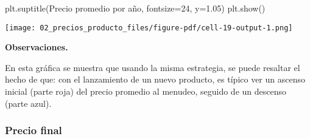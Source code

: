 \documentclass[
  letterpaper,
  DIV=11,
  numbers=noendperiod]{scrreprt}
\newenvironment{Shaded}{\begin{snugshade}}{\end{snugshade}}
\newcommand{\DecValTok}[1]{\textcolor[rgb]{0.68,0.00,0.00}{#1}}
\newcommand{\FloatTok}[1]{\textcolor[rgb]{0.68,0.00,0.00}{#1}}
\newcommand{\NormalTok}[1]{\textcolor[rgb]{0.00,0.23,0.31}{#1}}
\newcommand{\OperatorTok}[1]{\textcolor[rgb]{0.37,0.37,0.37}{#1}}
\newcommand{\StringTok}[1]{\textcolor[rgb]{0.13,0.47,0.30}{#1}}
\begin{document}
\begin{Shaded}
\begin{Highlighting}[]
\NormalTok{plt.suptitle(}\StringTok{\textquotesingle{}Precio promedio por año\textquotesingle{}}\NormalTok{, fontsize}\OperatorTok{=}\DecValTok{24}\NormalTok{, y}\OperatorTok{=}\FloatTok{1.05}\NormalTok{)}
\NormalTok{plt.show()}
\end{Highlighting}
\end{Shaded}

\texttt{[image: 02\_precios\_producto\_files/figure-pdf/cell-19-output-1.png]}

\textbf{Observaciones.}

En esta gráfica se muestra que usando la misma estrategia, se puede
resaltar el hecho de que: con el lanzamiento de un nuevo producto, es
típico ver un ascenso inicial (parte roja) del precio promedio al
menudeo, seguido de un descenso (parte azul).

\subsubsection{Precio final}\label{precio-final}
\end{document}
